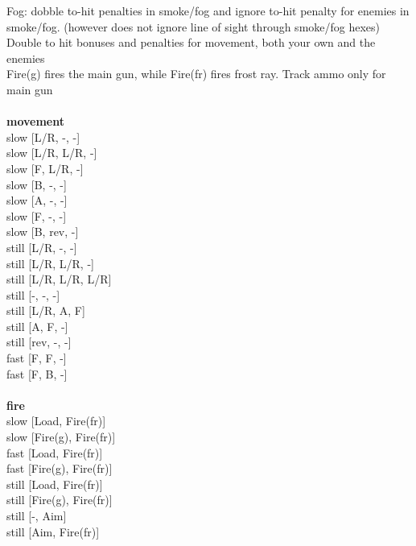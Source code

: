 \noindent Fog: dobble to-hit penalties in smoke/fog and ignore to-hit penalty for enemies in smoke/fog. (however does not ignore line of sight through smoke/fog hexes)\\ 
Double to hit bonuses and penalties for movement, both your own and the enemies\\ 
Fire(g) fires the main gun, while Fire(fr) fires frost ray. Track ammo only for main gun\\ 


\ \\ {\bf movement } \\
slow [L/R, -, -] \\
slow [L/R, L/R, -] \\
slow [F, L/R, -] \\
slow [B, -, -] \\
slow [A, -, -] \\
slow [F, -, -] \\
slow [B, rev, -] \\
still [L/R, -, -] \\
still [L/R, L/R, -] \\
still [L/R, L/R, L/R] \\
still [-, -, -] \\
still [L/R, A, F] \\
still [A, F, -] \\
still [rev, -, -] \\
fast [F, F, -] \\
fast [F, B, -] \\
\ \\ {\bf fire } \\
slow [Load, Fire(fr)] \\
slow [Fire(g), Fire(fr)] \\
fast [Load, Fire(fr)] \\
fast [Fire(g), Fire(fr)] \\
still [Load, Fire(fr)] \\
still [Fire(g), Fire(fr)] \\
still [-, Aim] \\
still [Aim, Fire(fr)] \\


